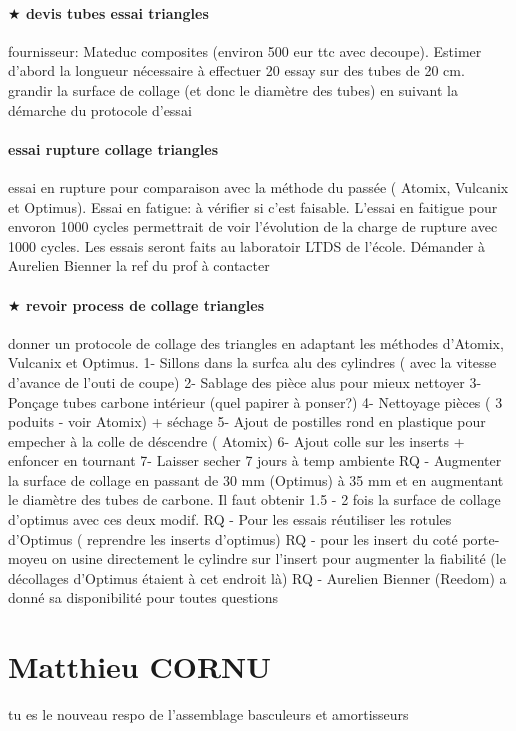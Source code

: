 \paragraph{$\bigstar$ devis tubes essai triangles} fournisseur: Mateduc composites (environ 500 eur ttc avec decoupe). Estimer d'abord la longueur nécessaire à effectuer 20 essay sur des tubes de 20 cm. grandir la surface de collage (et donc le diamètre des tubes) en suivant la démarche du protocole d'essai
\paragraph{essai rupture collage triangles} essai en rupture pour comparaison avec la méthode du passée ( Atomix, Vulcanix et Optimus). Essai en fatigue: à vérifier si c'est faisable. L'essai en faitigue pour envoron 1000 cycles permettrait de voir l'évolution de la charge de rupture avec 1000 cycles. Les essais seront faits au laboratoir LTDS de l'école. Démander à Aurelien Bienner la ref du prof à contacter
\paragraph{$\bigstar$ revoir process de collage triangles} donner un protocole de collage des triangles en adaptant les méthodes d'Atomix, Vulcanix et Optimus. 
1- Sillons dans la surfca alu des cylindres ( avec la vitesse d'avance de l'outi de coupe) 
2- Sablage des pièce alus pour mieux nettoyer
3- Ponçage tubes carbone intérieur (quel papirer à ponser?)
4- Nettoyage pièces ( 3 poduits - voir Atomix) + séchage
5- Ajout de postilles rond en plastique pour empecher à la colle de déscendre ( Atomix)
6- Ajout colle sur les inserts + enfoncer en tournant
7- Laisser secher 7 jours à temp ambiente
RQ - Augmenter la surface de collage en passant de 30 mm (Optimus) à 35 mm et en augmentant le diamètre des tubes de carbone. Il faut obtenir 1.5 - 2 fois la surface de collage d'optimus avec ces deux modif.
RQ - Pour les essais réutiliser les rotules d'Optimus ( reprendre les inserts d'optimus)
RQ - pour les insert du coté porte-moyeu on usine directement le cylindre sur l'insert pour augmenter la fiabilité (le décollages d'Optimus étaient à cet endroit là)
RQ - Aurelien Bienner (Reedom) a donné sa disponibilité pour toutes questions

 
 \newpage \section*{Matthieu CORNU} 
 \par tu es le nouveau respo de l'assemblage basculeurs et amortisseurs 
